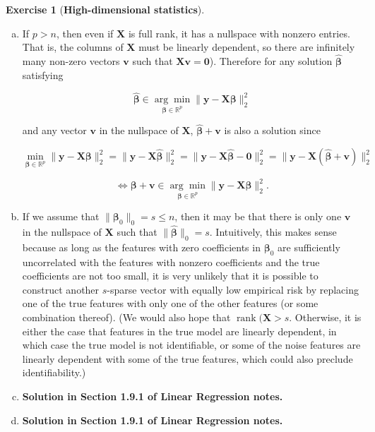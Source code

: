 \documentclass{article}
\theoremstyle{definition}
\newtheorem{exercise}{Exercise}
\theoremstyle{definition}
\theoremstyle{definition}
\theoremstyle{definition}
\begin{document}
\begin{exercise}[\textbf{High-dimensional statistics}]

\begin{enumerate}[(a)]

\item If \(p > n\), then even if \(\boldsymbol{X}\) is full rank, it has a nullspace with nonzero entries. That is, the columns of \(\boldsymbol{X}\) must be linearly dependent, so there are infinitely many non-zero vectors \(\boldsymbol{v}\) such that \(\boldsymbol{X}\boldsymbol{v} = \boldsymbol{0}\)). Therefore for any solution \(\hat{\boldsymbol{\beta}}\) satisfying 

\[
\hat{\boldsymbol{\beta}} \in \underset{\boldsymbol{\beta} \in \mathbb{R}^p}{\arg \min} \lVert \boldsymbol{y} - \boldsymbol{X} \boldsymbol{\beta} \rVert_2^2 
\]

and any vector \(\boldsymbol{v}\) in the nullspace of \(\boldsymbol{X}\), \(\hat{\boldsymbol{\beta}} + \boldsymbol{v}\) is also a solution since

\[
 \underset{\boldsymbol{\beta} \in \mathbb{R}^p}{\min} \lVert \boldsymbol{y} - \boldsymbol{X} \boldsymbol{\beta} \rVert_2^2 =  \lVert \boldsymbol{y} - \boldsymbol{X} \hat{\boldsymbol{\beta}} \rVert_2^2  =  \lVert \boldsymbol{y} - \boldsymbol{X} \hat{\boldsymbol{\beta}} - \boldsymbol{0} \rVert_2^2  =  \lVert \boldsymbol{y} - \boldsymbol{X} (\hat{\boldsymbol{\beta}} + \boldsymbol{v}) \rVert_2^2 
 \]
 
 \[
 \iff \boldsymbol{\beta} + \boldsymbol{v} \in \underset{\boldsymbol{\beta} \in \mathbb{R}^p}{\arg \min} \lVert \boldsymbol{y} - \boldsymbol{X} \boldsymbol{\beta} \rVert_2^2 .
\]

\item If we assume that \( \lVert \boldsymbol{\beta}_0 \rVert_0 = s \leq n\), then it may be that there is only one \(\boldsymbol{v}\) in the nullspace of \(\boldsymbol{X}\) such that \(\lVert \hat{\boldsymbol{\beta}}\rVert_0 = s\). Intuitively, this makes sense because as long as the features with zero coefficients in \(\boldsymbol{\beta}_0\) are sufficiently uncorrelated with the features with nonzero coefficients and the true coefficients are not too small, it is very unlikely that it is possible to construct another \(s\)-sparse vector with equally low empirical risk by replacing one of the true features with only one of the other features (or some combination thereof). (We would also hope that \(\operatorname{rank}(\boldsymbol{X} > s\). Otherwise, it is either the case that features in the true model are linearly dependent, in which case the true model is not identifiable, or some of the noise features are linearly dependent with some of the true features, which could also preclude identifiability.)

\item \textbf{Solution in Section 1.9.1 of Linear Regression notes.}

\item \textbf{Solution in Section 1.9.1 of Linear Regression notes.}

\end{enumerate}

\end{exercise}
\end{document}
